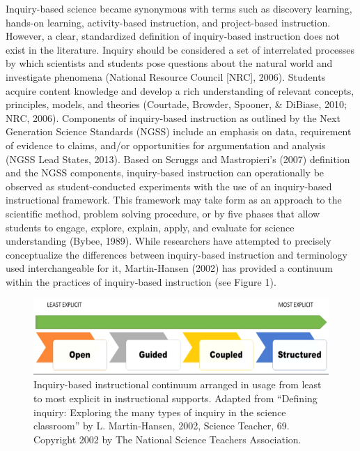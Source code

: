 \documentclass[11.5pt]{sig-alternate} %
\begin{document}
\begin{large}
Inquiry-based science became synonymous with terms such as discovery learning, hands-on learning, activity-based instruction, and project-based instruction.  However, a clear, standardized definition of inquiry-based instruction does not exist in the literature.  Inquiry should be considered a set of interrelated processes by which scientists and students pose questions about the natural world and investigate phenomena (National Resource Council [NRC], 2006).  Students acquire content knowledge and develop a rich understanding of relevant concepts, principles, models, and theories (Courtade, Browder, Spooner, \& DiBiase, 2010; NRC, 2006).  Components of inquiry-based instruction as outlined by the Next Generation Science Standards (NGSS) include an emphasis on data, requirement of evidence to claims, and/or opportunities for argumentation and analysis (NGSS Lead States, 2013).  Based on Scruggs and Mastropieri’s (2007) definition and the NGSS components, inquiry-based instruction can operationally be observed as student-conducted experiments with the use of an inquiry-based instructional framework.  This framework may take form as an approach to the scientific method, problem solving procedure, or by five phases that allow students to engage, explore, explain, apply, and evaluate for science understanding (Bybee, 1989).  While researchers have attempted to precisely conceptualize the differences between inquiry-based instruction and terminology used interchangeable for it, Martin-Hansen (2002) has provided a continuum within the practices of inquiry-based instruction (see Figure 1).
 
\begin{figure}[ht]
     \centering
     \includegraphics[width=1\linewidth]{fig1.png}
     \caption{ Inquiry-based instructional continuum arranged in usage from least to most explicit in instructional supports.  Adapted from “Defining inquiry: Exploring the many types of inquiry in the science classroom” by L. Martin-Hansen, 2002, Science Teacher, 69.  Copyright 2002 by The National Science Teachers Association. }
 \end{figure} 


\end{large}
\end{document}
